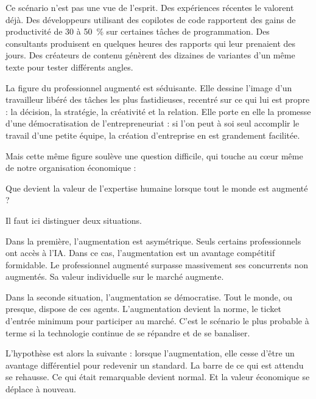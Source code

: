 Ce scénario n'est pas une vue de l'esprit. Des expériences récentes le valorent déjà. Des développeurs utilisant des copilotes de code rapportent des gains de productivité de 30 à 50~\% sur certaines tâches de programmation. Des consultants produisent en quelques heures des rapports qui leur prenaient des jours. Des créateurs de contenu génèrent des dizaines de variantes d'un même texte pour tester différents angles.

La figure du professionnel augmenté est séduisante. Elle dessine l'image d'un travailleur libéré des tâches les plus fastidieuses, recentré sur ce qui lui est propre : la décision, la stratégie, la créativité et la relation. Elle porte en elle la promesse d'une démocratisation de l'entrepreneuriat : si l'on peut à soi seul accomplir le travail d'une petite équipe, la création d'entreprise en est grandement facilitée.

Mais cette même figure soulève une question difficile, qui touche au cœur même de notre organisation économique :

\begin{aiquote}
Que devient la valeur de l'expertise humaine lorsque tout le monde est augmenté ?
\end{aiquote}

Il faut ici distinguer deux situations.

Dans la première, l'augmentation est asymétrique. Seuls certains professionnels ont accès à l'IA. Dans ce cas, l'augmentation est un avantage compétitif formidable. Le professionnel augmenté surpasse massivement ses concurrents non augmentés. Sa valeur individuelle sur le marché augmente.

Dans la seconde situation, l'augmentation se démocratise. Tout le monde, ou presque, dispose de ces agents. L'augmentation devient la norme, le ticket d'entrée minimum pour participer au marché. C'est le scénario le plus probable à terme si la technologie continue de se répandre et de se banaliser.

L'hypothèse est alors la suivante : lorsque l'augmentation, elle cesse d'être un avantage différentiel pour redevenir un standard. La barre de ce qui est attendu se rehausse. Ce qui était remarquable devient normal. Et la valeur économique se déplace à nouveau.

